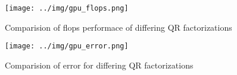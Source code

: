 \documentclass{article}[11pt]
\begin{document}
\begin{figure}
  \centering
  \caption{Comparision of flops performace of differing QR factorizations}
  \label{fig:qr_flops}

  \texttt{[image: ../img/gpu\_flops.png]}
\end{figure}

\begin{figure}
  \centering
  \caption{Comparision of error for differing QR factorizations}
  \label{fig:qr_error}

  \texttt{[image: ../img/gpu\_error.png]}
\end{figure}
\end{document}
